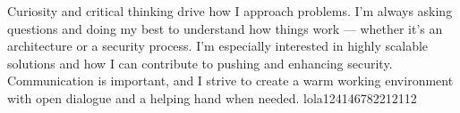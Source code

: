 \vspace{-1.5em}
\vspace{0.5em}

Curiosity and critical thinking drive how I approach problems. I’m always asking questions and doing my best to understand how things work — whether it's an architecture or a security process. I’m especially interested in highly scalable solutions and how I can contribute to pushing and enhancing security.
Communication is important, and I strive to create a warm working environment with open dialogue and a helping hand when needed. lola124146782212112